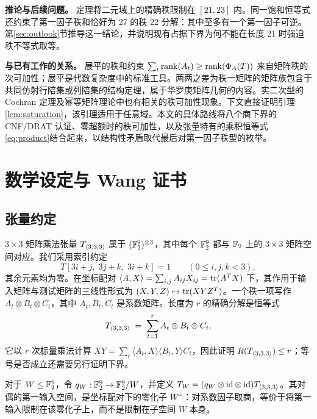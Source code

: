 \documentclass[11pt,a4paper]{article}
\begin{document}
\textbf{推论与后续问题。}\quad
定理将二元域上的精确秩限制在 $[21,23]$ 内。同一饱和恒等式还约束了第一因子秩和恰好为 27 的秩 22 分解：其中至多有一个第一因子可逆。第\ref{sec:outlook}节推导这一结论，并说明现有占据下界为何不能在长度 21 时强迫秩不等式取等。

\textbf{与已有工作的关系。}\quad
展平的秩和约束 $\sum_t\operatorname{rank}(A_t)\ge\operatorname{rank}(\Phi_A(T))$ 来自矩阵秩的次可加性；展平是代数复杂度中的标准工具\cite{burgisser1997algebraic,blaser1999focs}。两两之差为秩一矩阵的矩阵族包含于共同仿射行陪集或列陪集的结构定理，属于华罗庚矩阵几何的内容\cite{hua1945geometries,wan1996geometry,pazzis2015hua}。实二次型的 Cochran 定理\cite{cochran1934distribution}及幂等矩阵理论\cite{tian2001rank}中也有相关的秩可加性现象。下文直接证明引理\ref{lem:saturation}，该引理适用于任意域。本文的具体路线将八个商下界的 CNF/DRAT 认证、零超额时的秩可加性，以及张量特有的乘积恒等式\eqref{eq:product}结合起来，以结构性矛盾取代最后对第一因子秩型的枚举。



\section{数学设定与 Wang 证书}\label{sec:setting}

\subsection{张量约定}

$3\times3$ 矩阵乘法张量 $T_{\langle3,3,3\rangle}$ 属于 $(\mathbb{F}_2^9)^{\otimes3}$，其中每个 $\mathbb{F}_2^9$ 都与 $\mathbb{F}_2$ 上的 $3\times3$ 矩阵空间对应。我们采用索引约定
\begin{equation}\label{eq:tensor}
  T[3i+j,\;3j+k,\;3i+k] = 1 \qquad (0\le i,j,k<3),
\end{equation}
其余元素均为零。在坐标配对 $\langle A,X\rangle=\sum_{i,j}A_{ij}X_{ij}=\operatorname{tr}(A^TX)$ 下，其作用于输入矩阵与测试矩阵的三线性形式为 $(X,Y,Z)\mapsto\operatorname{tr}(XYZ^T)$。一个秩一项写作 $A_t\otimes B_t\otimes C_t$，其中 $A_t,B_t,C_t$ 是系数矩阵。长度为 $r$ 的精确分解是恒等式
\begin{equation}\label{eq:general-decomposition}
  T_{\langle3,3,3\rangle} \;=\; \sum_{t=1}^r A_t\otimes B_t\otimes C_t,
\end{equation}
它以 $r$ 次标量乘法计算 $XY=\sum_t\langle A_t,X\rangle\langle B_t,Y\rangle C_t$，因此证明 $R(T_{\langle3,3,3\rangle})\le r$；等号是否成立还需要另行证明下界。

对于 $W\le\mathbb{F}_2^9$，令 $q_W:\mathbb{F}_2^9\to\mathbb{F}_2^9/W$，并定义 $T_W=(q_W\otimes\mathrm{id}\otimes\mathrm{id})T_{\langle3,3,3\rangle}$。其对偶的第一输入空间，是坐标配对下的零化子 $W^\perp$：对系数因子取商，等价于将第一输入限制在该零化子上，而不是限制在子空间 $W$ 本身。
\end{document}
